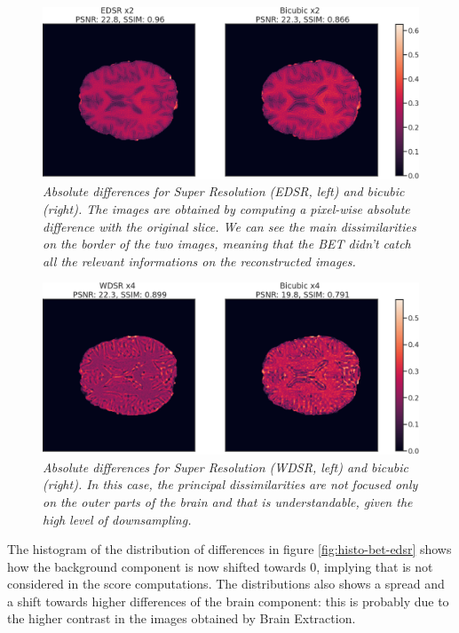 \documentclass[12pt,a4paper]{report}
\begin{document}
\begin{figure}[H]
\centering
 \includegraphics[scale=0.4]{./images/edsr_diff_betted}
 \caption{\it Absolute differences for Super Resolution (EDSR, left) and bicubic (right). The images are obtained by computing a pixel-wise absolute difference with the original slice. We can see the main dissimilarities on the border of the two images, meaning that the BET didn't catch all the relevant informations on the reconstructed images.}
 \label{fig:edsr-bet-diff}
\end{figure}

\begin{figure}[H]
\centering
 \includegraphics[scale=0.4]{./images/wdsr_diff_betted}
 \caption{\it Absolute differences for Super Resolution (WDSR, left) and bicubic (right). In this case, the principal dissimilarities are not focused only on the outer parts of the brain and that is understandable, given the high level of downsampling.}
 \label{fig:wdsr-bet-diff}
\end{figure}

The histogram of the distribution of differences in figure \ref{fig:histo-bet-edsr} shows how the background component is now shifted towards 0, implying that is not considered in the score computations. 
The distributions also shows a spread and a shift towards higher differences of the brain component: this is probably due to the higher contrast in the images obtained by Brain Extraction.
\end{document}
